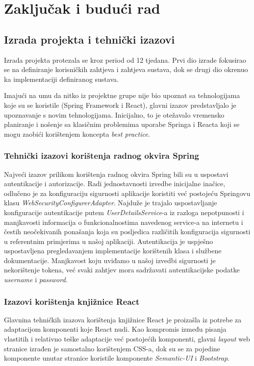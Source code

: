 \chapter{Zaključak i budući rad}

		
		 
		 \section{Izrada projekta i tehnički izazovi}
		 
		 Izrada projekta protezala se kroz period od 12 tjedana. Prvi dio izrade fokusirao se na definiranje korisničkih zahtjeva i zahtjeva sustava, dok se drugi dio okrenuo ka implementaciji definiranog sustava.
		 
		 Imajući na umu da nitko iz projektne grupe nije bio upoznat sa tehnologijama koje su se koristile (Spring Framework i React), glavni izazov predstavljalo je upoznavanje s novim tehnologijama. \newline
		 Inicijalno, to je otežavalo vremensko planiranje i nošenje sa klasičnim problemima uporabe Springa i Reacta koji se mogu zaobići korištenjem koncepta \textit{best practice}. \newline 
		 
		 \subsection{Tehnički izazovi korištenja radnog okvira Spring}
		 Najveći izazov prilikom korištenja radnog okvira Spring bili su u uspostavi autentikacije i autorizacije. Radi jednostavnosti izvedbe inicijalne inačice, odlučeno je za konfiguraciju sigurnosti aplikacije koristiti već postojeću Springovu klasu \textit{WebSecurityConfigurerAdapter}. Najduže je trajalo uspostavljanje konfiguracije autentikacije putem \textit{UserDetailsService}-a iz razloga nepotpunosti i manjkavosti informacija o funkcionalnostima navedenog service-a na internetu i čestih neočekivanih ponašanja koja su posljedica različitih konfiguracija sigurnosti u referentnim primjerima u našoj aplikaciji. Autentikacija je uspješno uspostavljena pregledavanjem implementacije korištenih klasa i službene dokumentacije. 
		 Manjkavost koju uviđamo u našoj izvedbi sigurnosti je nekorištenje tokena, već svaki zahtjev mora sadržavati autentikacijske podatke \textit{username} i \textit{password}.
			 
	
		
		\subsection{Izazovi korištenja knjižnice React}
		Glavnina tehničkih izazova korištenja knjižnice React je proizašla iz potrebe za adaptacijom komponenti koje React nudi. Kao kompromis između pisanja vlastitih i relativno teške adaptacije već postojećih komponenti, glavni \textit{layout} web stranice izrađen je samostalno korištenjem CSS-a, dok su se za pojedine komponente unutar stranice koristile komponente \textit{Semantic-UI} i \textit{Bootstrap}. \newline
		
